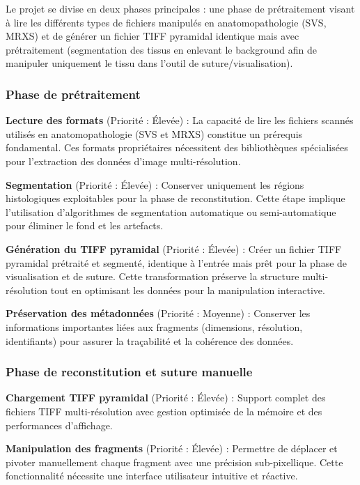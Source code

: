 \documentclass[12pt,a4paper]{report}
\begin{document}
Le projet se divise en deux phases principales : une phase de prétraitement visant à lire les différents types de fichiers manipulés en anatomopathologie (SVS, MRXS) et de générer un fichier TIFF pyramidal identique mais avec prétraitement (segmentation des tissus en enlevant le background afin de manipuler uniquement le tissu dans l'outil de suture/visualisation).

\subsubsection{Phase de prétraitement}

\textbf{Lecture des formats} (Priorité : Élevée) : La capacité de lire les fichiers scannés utilisés en anatomopathologie (SVS et MRXS) constitue un prérequis fondamental. Ces formats propriétaires nécessitent des bibliothèques spécialisées pour l'extraction des données d'image multi-résolution.

\textbf{Segmentation} (Priorité : Élevée) : Conserver uniquement les régions histologiques exploitables pour la phase de reconstitution. Cette étape implique l'utilisation d'algorithmes de segmentation automatique ou semi-automatique pour éliminer le fond et les artefacts.

\textbf{Génération du TIFF pyramidal} (Priorité : Élevée) : Créer un fichier TIFF pyramidal prétraité et segmenté, identique à l'entrée mais prêt pour la phase de visualisation et de suture. Cette transformation préserve la structure multi-résolution tout en optimisant les données pour la manipulation interactive.

\textbf{Préservation des métadonnées} (Priorité : Moyenne) : Conserver les informations importantes liées aux fragments (dimensions, résolution, identifiants) pour assurer la traçabilité et la cohérence des données.

\subsubsection{Phase de reconstitution et suture manuelle}

\textbf{Chargement TIFF pyramidal} (Priorité : Élevée) : Support complet des fichiers TIFF multi-résolution avec gestion optimisée de la mémoire et des performances d'affichage.

\textbf{Manipulation des fragments} (Priorité : Élevée) : Permettre de déplacer et pivoter manuellement chaque fragment avec une précision sub-pixellique. Cette fonctionnalité nécessite une interface utilisateur intuitive et réactive.
\end{document}
